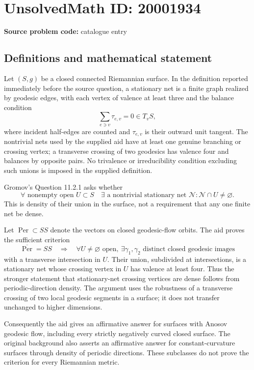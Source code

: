 \documentclass[11pt]{article}
\begin{document}
\section*{UnsolvedMath ID: 20001934}
\textbf{Source problem code:} catalogue entry
\subsection{Definitions and mathematical statement}
Let \((S,g)\) be a closed connected Riemannian surface. In the definition reported immediately before the source question, a stationary net is a finite graph realized by geodesic edges, with each vertex of valence at least three and the balance condition
\[
 \sum_{e\ni v}\tau_{e,v}=0\in T_vS,
\]
where incident half-edges are counted and \(\tau_{e,v}\) is their outward unit tangent. The nontrivial nets used by the supplied aid have at least one genuine branching or crossing vertex; a transverse crossing of two geodesics has valence four and balances by opposite pairs. No trivalence or irreducibility condition excluding such unions is imposed in the supplied definition.

Gromov's Question 11.2.1 asks whether
\[
 \forall\text{ nonempty open }U\subset S\quad
 \exists\text{ a nontrivial stationary net }\mathcal N:
 \mathcal N\cap U\ne\varnothing.
\]
This is density of their union in the surface, not a requirement that any one finite net be dense.

Let \(\operatorname{Per}\subset SS\) denote the vectors on closed geodesic-flow orbits. The aid proves the sufficient criterion
\[
 \overline{\operatorname{Per}}=SS
 \quad\Longrightarrow\quad
 \forall U\ne\varnothing\text{ open},\ 
 \exists\gamma_1,\gamma_2\text{ distinct closed geodesic images}
\]
with a transverse intersection in \(U\). Their union, subdivided at intersections, is a stationary net whose crossing vertex in \(U\) has valence at least four. Thus the stronger statement that stationary-net crossing vertices are dense follows from periodic-direction density. The argument uses the robustness of a transverse crossing of two local geodesic segments in a surface; it does not transfer unchanged to higher dimensions.

Consequently the aid gives an affirmative answer for surfaces with Anosov geodesic flow, including every strictly negatively curved closed surface. The original background also asserts an affirmative answer for constant-curvature surfaces through density of periodic directions. These subclasses do not prove the criterion for every Riemannian metric.
\end{document}
